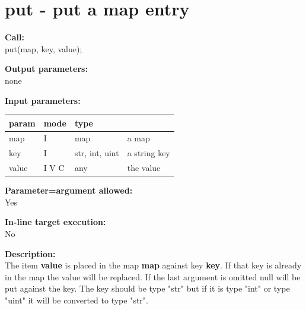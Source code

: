 %        
%        
        


    \section{put - put a map entry}\label{sec:ipput}
        
        {\bf Call:} \\
        put(map, key, value);
        
        {\bf Output parameters:} \\
        none
        
        {\bf Input parameters:} \\
        \begin{tabular}{| l | l | l | l |}
        \hline
        param  & mode & type & \\
        \hline \hline
        map    & I     & map             & a map        \\ \hline
        key    & I     & str, int, uint  & a string key \\ \hline
        value  & I V C & any             & the value    \\ \hline
        \end{tabular}
        
        {\bf Parameter=argument allowed:} \\
        Yes
        
        {\bf In-line target execution:} \\
        No
        
        {\bf Description:} \\
        The item {\bf value} is placed in the map {\bf map} against key
        {\bf key}. If that key is already in the map the value will
        be replaced. If the last argument is omitted null will be put
        against the key. The key should be type "str" but if it is
        type "int" or type "uint" it will be converted to type "str".


